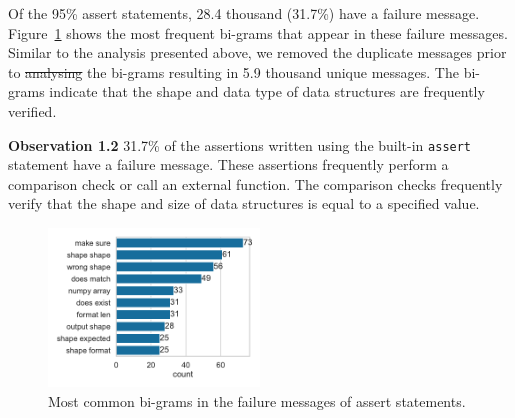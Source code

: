 \documentclass[smallextended]{svjour3}       %
\newcommand{\highlight}[1]{\begin{framed}%
  \noindent#1
\end{framed}}
\providecommand{\DIFadd}[1]{{\protect\color{blue}\uwave{#1}}} %
\providecommand{\DIFdel}[1]{{\protect\color{red}\sout{#1}}} %
\providecommand{\DIFaddbegin}{} %
\providecommand{\DIFaddend}{} %
\providecommand{\DIFdelbegin}{} %
\providecommand{\DIFdelend}{} %
\newcommand{\DIFscaledelfig}{0.5}
\newlength{\DIFdelgraphicswidth} %
\newlength{\DIFdelgraphicsheight} %
\newcommand{\DIFaddincludegraphics}[2][]{{\color{blue}\fbox{\DIFOincludegraphics[#1]{#2}}}} %
\newcommand{\DIFdelincludegraphics}[2][]{%
\sbox{\DIFdelgraphicsbox}{\DIFOincludegraphics[#1]{#2}}%
\settoboxwidth{\DIFdelgraphicswidth}{\DIFdelgraphicsbox} %
\settoboxtotalheight{\DIFdelgraphicsheight}{\DIFdelgraphicsbox} %
\scalebox{\DIFscaledelfig}{%
\parbox[b]{\DIFdelgraphicswidth}{\usebox{\DIFdelgraphicsbox}\\[-\baselineskip] \rule{\DIFdelgraphicswidth}{0em}}\llap{\resizebox{\DIFdelgraphicswidth}{\DIFdelgraphicsheight}{%
\setlength{\unitlength}{\DIFdelgraphicswidth}%
\begin{picture}(1,1)%
\thicklines\linethickness{2pt} %
{\color[rgb]{1,0,0}\put(0,0){\framebox(1,1){}}}%
{\color[rgb]{1,0,0}\put(0,0){\line( 1,1){1}}}%
{\color[rgb]{1,0,0}\put(0,1){\line(1,-1){1}}}%
\end{picture}%
}\hspace*{3pt}}} %
} %
\DeclareRobustCommand{\DIFaddbegin}{\DIFOaddbegin \let\includegraphics\DIFaddincludegraphics} %
\DeclareRobustCommand{\DIFaddend}{\DIFOaddend \let\includegraphics\DIFOincludegraphics} %
\DeclareRobustCommand{\DIFdelbegin}{\DIFOdelbegin \let\includegraphics\DIFdelincludegraphics} %
\DeclareRobustCommand{\DIFdelend}{\DIFOaddend \let\includegraphics\DIFOincludegraphics} %
\begin{document}
Of the 95\% assert statements, 28.4 thousand (31.7\%) have a failure message. Figure~\ref{fig:common-assert-msgs} shows the most frequent bi-grams that appear in these failure messages. Similar to the analysis presented above, we removed the duplicate messages prior to \DIFdelbegin \DIFdel{analysing }\DIFdelend \DIFaddbegin \DIFadd{analyzing }\DIFaddend the bi-grams resulting in 5.9 thousand unique messages. The bi-grams indicate that the shape and data type of data structures are frequently verified.

\DIFdelbegin %
\DIFdelend \DIFaddbegin \highlight{\textbf{Observation 1.2} 31.7\% of the assertions written using the built-in {\color{blue}%
\lstinline{assert} %
}%
statement have a failure message. These assertions frequently perform a comparison check or call an external function. The comparison checks frequently verify that the shape and size of data structures is equal to a specified value.}
\DIFaddend 

\begin{figure}
	\centering
	\includegraphics[width=0.5\textwidth]{common-assert-msgs.pdf}
	\caption{Most common bi-grams in the failure messages of assert statements.}
	\label{fig:common-assert-msgs}
\end{figure}
\end{document}
